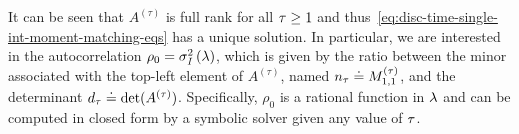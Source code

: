 It can be seen that $ A^{(\tau)} $ is full rank for all $ \tau \ge 1 $ and thus~\eqref{eq:disc-time-single-int-moment-matching-eqs} has a unique solution.
In particular, we are interested in the autocorrelation $ \rho_0 = \sigma^{2}_{\textit{I}}\left(\lambda\right) $,
which is given by
the ratio between the minor associated with the top-left element of $ A^{(\tau)} $,
named $ n_\tau \doteq M^{(\tau)}_{1,1} $, and the determinant $ d_\tau \doteq \det(A^{(\tau)}) $.
Specifically, $ \rho_0 $ is a rational function in $ \lambda $
and can be computed in closed form by a symbolic solver
given any value of $ \tau $.

